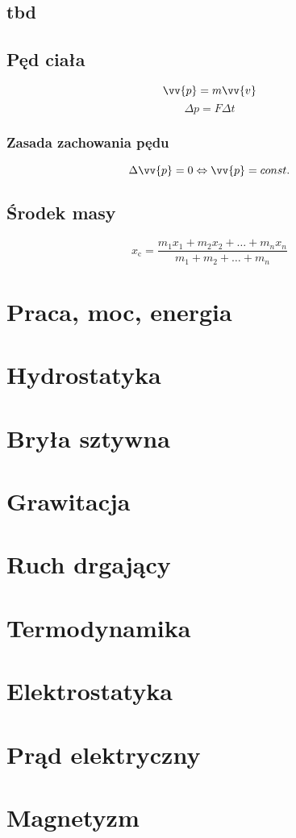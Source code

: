 \documentclass{article}
\begin{document}
    \subsection{tbd}
    \subsection{Pęd ciała}
      \begin{equation*}
        \vv{p} = m\vv{v}
      \end{equation*}
      \begin{equation*}
        \Delta p = F\Delta t
      \end{equation*}
      \subsubsection{Zasada zachowania pędu}
        \begin{equation*}
          \Delta \vv{p} = 0 \Leftrightarrow \vv{p} = const.
        \end{equation*}
      \subsection{Środek masy}
        \begin{equation*}
          x_{\mathrm{c}} = \frac{m_{1}x_{1}+m_{2}x_{2}+\dots+m_{n}x_{n}}{m_{1}+m_{2}+\dots+m_{n}}
        \end{equation*}

  \newpage
  \section{Praca, moc, energia}

  \newpage
  \section{Hydrostatyka}

  \newpage
  \section{Bryła sztywna}

  \newpage
  \section{Grawitacja}

  \newpage
  \section{Ruch drgający}

  \newpage
  \section{Termodynamika}

  \newpage
  \section{Elektrostatyka}

  \newpage
  \section{Prąd elektryczny}

  \newpage
  \section{Magnetyzm}
\end{document}
